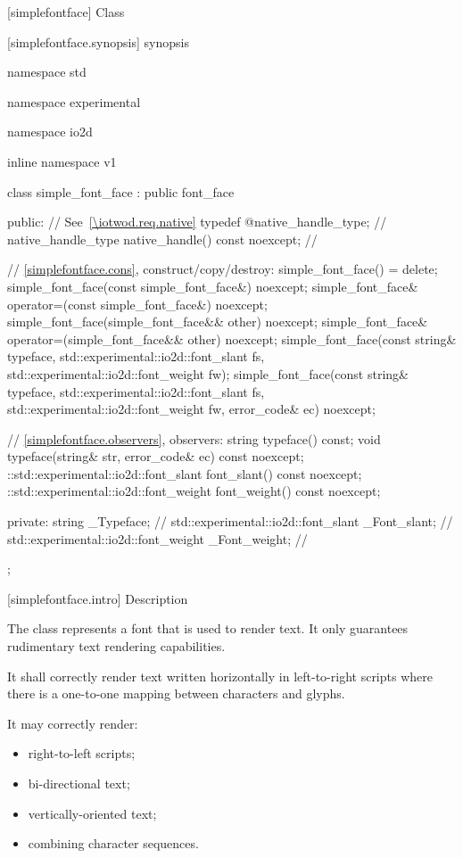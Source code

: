  [simplefontface] {Class }

 [simplefontface.synopsis] { synopsis}

\begin{codeblock}
namespace std { namespace experimental { namespace io2d { inline namespace v1 {
  class simple_font_face : public font_face {
  public:
    // See~\ref{\iotwod.req.native}
    typedef @\impdef@ native_handle_type; // \expos
    native_handle_type native_handle() const noexcept; // \expos
    
    // \ref{simplefontface.cons}, construct/copy/destroy:
    simple_font_face() = delete;
    simple_font_face(const simple_font_face&) noexcept;
    simple_font_face& operator=(const simple_font_face&) noexcept;
    simple_font_face(simple_font_face&& other) noexcept;
    simple_font_face& operator=(simple_font_face&& other) noexcept;
    simple_font_face(const string& typeface,
      std::experimental::io2d::font_slant fs,
      std::experimental::io2d::font_weight fw);
    simple_font_face(const string& typeface,
      std::experimental::io2d::font_slant fs,
      std::experimental::io2d::font_weight fw, error_code& ec) noexcept;

    // \ref{simplefontface.observers}, observers:
    string typeface() const;
    void typeface(string& str, error_code& ec) const noexcept;
    ::std::experimental::io2d::font_slant font_slant() const noexcept;
    ::std::experimental::io2d::font_weight font_weight() const noexcept;

  private:
    string _Typeface;                                    // \expos
    std::experimental::io2d::font_slant _Font_slant;   // \expos
    std::experimental::io2d::font_weight _Font_weight; // \expos
  };
} } } }
\end{codeblock}

 [simplefontface.intro] { Description}

\pnum
{}
The  class represents a font that is used to render text. It only guarantees rudimentary text rendering capabilities.

\pnum
It shall correctly render text written horizontally in left-to-right scripts where there is a one-to-one mapping between characters and glyphs.

\pnum
It may correctly render:
\begin{itemize}
	\item right-to-left scripts;
	\item bi-directional text;
	\item vertically-oriented text;
	\item combining character sequences.
\end{itemize}

